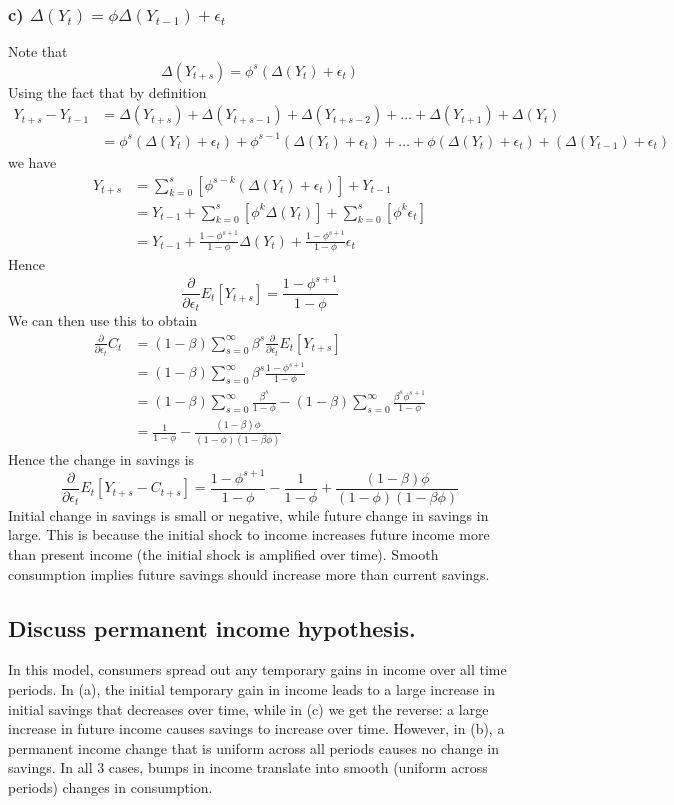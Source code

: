 \documentclass[11pt]{amsart}
\begin{document}
\subsubsection*{c) $\Delta(Y_t) = \phi\Delta(Y_{t-1}) + \epsilon_t$}
Note that \[
\Delta(Y_{t+s}) = \phi^s(\Delta(Y_t) + \epsilon_t)
\]
Using the fact that by definition
\begin{align*}
	Y_{t+s} - Y_{t-1} &= \Delta(Y_{t+s}) + \Delta(Y_{t+s-1}) + \Delta(Y_{t+s-2}) + \ldots + \Delta(Y_{t+1}) + \Delta(Y_{t}) \\
	&= \phi^s(\Delta(Y_t) + \epsilon_t) + \phi^{s-1}(\Delta(Y_t) + \epsilon_t) + \ldots + \phi(\Delta(Y_t) + \epsilon_t) + (\Delta(Y_{t-1}) + \epsilon_t)
\end{align*}
we have
\begin{align*}
	Y_{t+s} &= \sum_{k=0}^s \left[ \phi^{s-k} (\Delta(Y_t) + \epsilon_t) \right] + Y_{t-1} \\
	&= Y_{t-1} + \sum_{k=0}^s \left[ \phi^{k} \Delta(Y_t) \right] + \sum_{k=0}^s \left[ \phi^{k} \epsilon_t \right] \\
	&= Y_{t-1} + \frac{1 - \phi^{s+1}}{1 - \phi} \Delta(Y_t) + \frac{1 - \phi^{s+1}}{1 - \phi} \epsilon_t
\end{align*}
Hence
\[
\frac{\partial}{\partial \epsilon_t} E_t [Y_{t+s}] = \frac{1 - \phi^{s+1}}{1 - \phi}
\]
We can then use this to obtain
\begin{align*}
	\frac{\partial}{\partial \epsilon_t} C_t &= (1-\beta) \sum_{s=0}^\infty \beta^s \frac{\partial}{\partial \epsilon_t} E_t [Y_{t+s}] \\
	&= (1-\beta) \sum_{s=0}^\infty \beta^s \frac{1 - \phi^{s+1}}{1 - \phi} \\
	&= (1-\beta) \sum_{s=0}^\infty \frac{\beta^s}{1 - \phi} - (1-\beta) \sum_{s=0}^\infty \frac{\beta^s\phi^{s+1}}{1 - \phi} \\
	&= \frac{1}{1-\phi} - \frac{(1-\beta) \phi}{(1-\phi)(1-\beta\phi)}
\end{align*}
Hence the change in savings is
\[
\frac{\partial}{\partial \epsilon_t} E_t [Y_{t+s} - C_{t+s}] = \frac{1 - \phi^{s+1}}{1 - \phi} - \frac{1}{1-\phi} + \frac{(1-\beta) \phi}{(1-\phi)(1-\beta\phi)}
\]
Initial change in savings is small or negative, while future change in savings in large. This is because the initial shock to income increases future income more than present income (the initial shock is amplified over time). Smooth consumption implies future savings should increase more than current savings.

\subsection{Discuss permanent income hypothesis.} In this model, consumers spread out any temporary gains in income over all time periods. In (a), the initial temporary gain in income leads to a large increase in initial savings that decreases over time, while in (c) we get the reverse: a large increase in future income causes savings to increase over time. However, in (b), a permanent income change that is uniform across all periods causes no change in savings. In all 3 cases, bumps in income translate into smooth (uniform across periods) changes in consumption.
\end{document}

